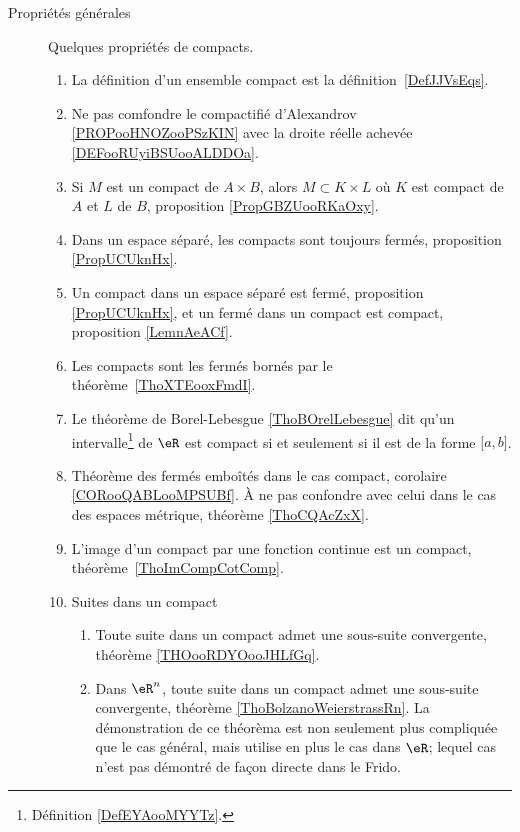         \label{THEMEooQQBHooLcqoKB}
    \begin{description}

        \item[Propriétés générales]

            Quelques propriétés de compacts.

                \begin{enumerate}
    \item
        La définition d'un ensemble compact est la définition~\ref{DefJJVsEqs}.
    \item
        Ne pas comfondre le compactifié d'Alexandrov \ref{PROPooHNOZooPSzKIN} avec la droite réelle achevée \ref{DEFooRUyiBSUooALDDOa}.
    \item
        Si \( M\) est un compact de \( A\times B\), alors \( M\subset K\times L\) où \( K\) est compact de \( A\) et \( L\) de \( B\), proposition \ref{PropGBZUooRKaOxy}.
    \item
        Dans un espace séparé, les compacts sont toujours fermés, proposition \ref{PropUCUknHx}.
    \item
        Un compact dans un espace séparé est fermé, proposition \ref{PropUCUknHx}, et un fermé dans un compact est compact, proposition \ref{LemnAeACf}.
    \item
        Les compacts sont les fermés bornés par le théorème~\ref{ThoXTEooxFmdI}.
    \item
        Le théorème de Borel-Lebesgue \ref{ThoBOrelLebesgue} dit qu'un intervalle\footnote{Définition \ref{DefEYAooMYYTz}.} de \( \eR\) est compact si et seulement si il est de la forme \( \mathopen[ a , b \mathclose]\).
    \item
        Théorème des fermés emboîtés dans le cas compact, corolaire \ref{CORooQABLooMPSUBf}. À ne pas confondre avec celui dans le cas des espaces métrique, théorème \ref{ThoCQAcZxX}.
    \item
        L'image d'un compact par une fonction continue est un compact, théorème~\ref{ThoImCompCotComp}.
    \item
        Suites dans un compact
        \begin{enumerate}
            \item
                Toute suite dans un compact admet une sous-suite convergente, théorème \ref{THOooRDYOooJHLfGq}.
            \item
                Dans \( \eR^n\), toute suite dans un compact admet une sous-suite convergente, théorème \ref{ThoBolzanoWeierstrassRn}. La démonstration de ce théorèma est non seulement plus compliquée que le cas général, mais utilise en plus le cas dans \( \eR\); lequel cas n'est pas démontré de façon directe dans le Frido.

\end{enumerate}
\end{enumerate}
\end{description}
